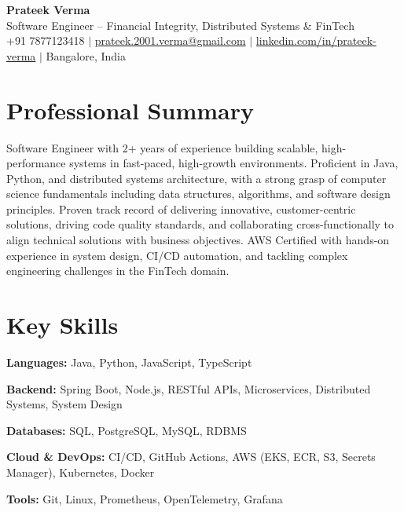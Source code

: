 \documentclass[letterpaper,10.5pt]{article}
\begin{document}
\begin{center}
  {\LARGE \textbf{Prateek Verma}} \\[4pt]
  \small Software Engineer -- Financial Integrity, Distributed Systems \& FinTech \\[4pt]
  +91 7877123418 \;$|$\;
  \href{mailto:prateek.2001.verma@gmail.com}{prateek.2001.verma@gmail.com} \;$|$\;
  \href{https://linkedin.com/in/prateek-verma-8125b3201}{linkedin.com/in/prateek-verma} \;$|$\;
  Bangalore, India
\end{center}

\section{Professional Summary}
\small{
Software Engineer with 2+ years of experience building scalable, high-performance systems in fast-paced, high-growth environments. Proficient in Java, Python, and distributed systems architecture, with a strong grasp of computer science fundamentals including data structures, algorithms, and software design principles. Proven track record of delivering innovative, customer-centric solutions, driving code quality standards, and collaborating cross-functionally to align technical solutions with business objectives. AWS Certified with hands-on experience in system design, CI/CD automation, and tackling complex engineering challenges in the FinTech domain.
}

\section{Key Skills}
\begin{itemize}[leftmargin=0.15in, label={}, itemsep=-1pt]
  \small{
    \item \textbf{Languages:} Java, Python, JavaScript, TypeScript
    \item \textbf{Backend:} Spring Boot, Node.js, RESTful APIs, Microservices, Distributed Systems, System Design
    \item \textbf{Databases:} SQL, PostgreSQL, MySQL, RDBMS
    \item \textbf{Cloud \& DevOps:} CI/CD, GitHub Actions, AWS (EKS, ECR, S3, Secrets Manager), Kubernetes, Docker
    \item \textbf{Tools:} Git, Linux, Prometheus, OpenTelemetry, Grafana
  }
\end{itemize}
\end{document}

